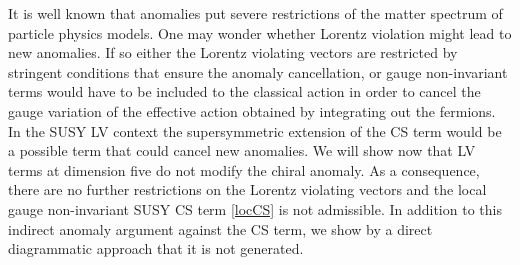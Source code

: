 \documentclass[12pt]{revtex4}
\begin{document}
It is well known that anomalies put severe restrictions of the matter
spectrum of particle physics models. One may wonder whether Lorentz
violation might lead to new anomalies. If so either the Lorentz
violating vectors are restricted by stringent conditions that ensure the
anomaly cancellation, or gauge non-invariant terms would have to be
included to the classical action in order to cancel the gauge
variation of the effective action obtained by integrating out the
fermions. In the SUSY LV context the supersymmetric extension of the
CS term would be a possible term that could cancel new  
anomalies. We will show now that LV terms at dimension five
do not modify the chiral anomaly. As a consequence, there are no
further restrictions on the Lorentz violating vectors and the 
local gauge non-invariant SUSY CS term \eqref{locCS} is not
admissible. In addition to this indirect anomaly argument against the
CS term, we show by a direct diagrammatic approach that it is not
generated. 
\end{document}
